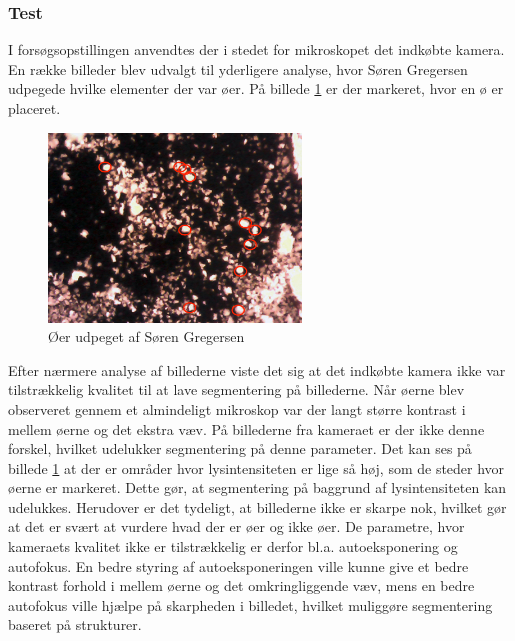 \subsubsection{Test}
I forsøgsopstillingen anvendtes der i stedet for mikroskopet det indkøbte kamera. En række billeder blev udvalgt til yderligere analyse, hvor Søren Gregersen udpegede hvilke elementer der var øer. På billede \ref{fig:isletSG} er der markeret, hvor en ø er placeret.

\begin{figure}[H]
	\centering
	\includegraphics[width=0.6\textwidth]{billeder/software/sgbillede.png}
	\caption{Øer udpeget af Søren Gregersen}
	\label{fig:isletSG}
\end{figure}

Efter nærmere analyse af billederne viste det sig at det indkøbte kamera ikke var tilstrækkelig kvalitet til at lave segmentering på billederne. Når øerne blev observeret gennem et almindeligt mikroskop var der langt større kontrast i mellem øerne og det ekstra væv. På billederne fra kameraet er der ikke denne forskel, hvilket udelukker segmentering på denne parameter. Det kan ses på billede \ref{fig:isletSG} at der er områder hvor lysintensiteten er lige så høj, som de steder hvor øerne er markeret. Dette gør, at segmentering på baggrund af lysintensiteten kan udelukkes. Herudover er det tydeligt, at billederne ikke er skarpe nok, hvilket gør at det er svært at vurdere hvad der er øer og ikke øer. De parametre, hvor kameraets kvalitet ikke er tilstrækkelig er derfor bl.a. autoeksponering og autofokus. En bedre styring af autoeksponeringen ville kunne give et bedre kontrast forhold i mellem øerne og det omkringliggende væv, mens en bedre autofokus ville hjælpe på skarpheden i billedet, hvilket muliggøre segmentering baseret på strukturer.


